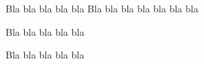 Bla bla bla \cite{x} bla bla \cite{y}
Bla bla bla \cite{x} bla bla
\cite{a} bla bla \cite{b}

Bla bla bla \cite
{c} bla bla

Bla bla bla \cite {d} bla bla
